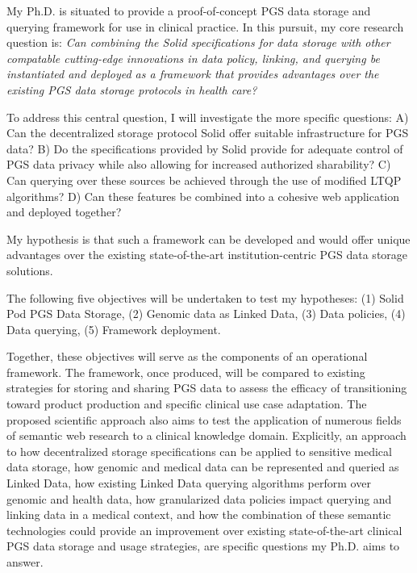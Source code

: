 \documentclass[runningheads]{llncs}
\begin{document}
My Ph.D. is situated to provide a proof-of-concept PGS data storage and querying framework for use in clinical practice. 
In this pursuit, my core research question is: 
\textit{Can combining the Solid specifications for data storage with other compatable cutting-edge innovations in data policy, linking, and querying be instantiated and deployed as a framework that provides advantages over the existing PGS data storage protocols in health care?}

To address this central question, I will investigate the more specific questions: 
A) Can the decentralized storage protocol Solid \cite{capadisli_solid_nodate} offer suitable infrastructure for PGS data? 
B) Do the specifications provided by Solid provide for adequate control of PGS data privacy while also allowing for increased authorized sharability? 
C) Can querying over these sources be achieved through the use of modified LTQP algorithms?
D) Can these features be combined into a cohesive web application and deployed together?

My hypothesis is that such a framework can be developed and would offer unique advantages over the existing state-of-the-art institution-centric PGS data storage solutions. 

The following five objectives will be undertaken to test my hypotheses:
(1) Solid Pod PGS Data Storage, 
(2) Genomic data as Linked Data,
(3) Data policies,
(4) Data querying,
(5) Framework deployment.

Together, these objectives will serve as the components of an operational framework. 
The framework, once produced, will be compared to existing strategies for storing and sharing PGS data to assess the efficacy of transitioning toward product production and specific clinical use case adaptation.
The proposed scientific approach also aims to test the application of numerous fields of semantic web research to a clinical knowledge domain. 
Explicitly, an approach to how decentralized storage specifications can be applied to sensitive medical data storage, how genomic and medical data can be represented and queried as Linked Data, how existing Linked Data querying algorithms perform over genomic and health data, how granularized data policies impact querying and linking data in a medical context, and how the combination of these semantic technologies could provide an improvement over existing state-of-the-art clinical PGS data storage and usage strategies, are specific questions my Ph.D. aims to answer.
\end{document}
